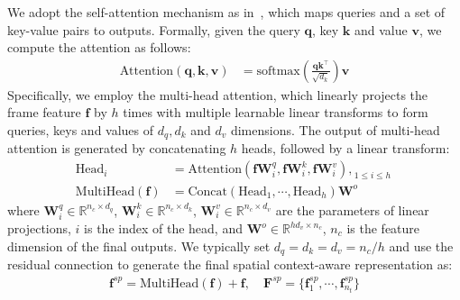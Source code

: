 \documentclass{article}
\begin{document}
We adopt the self-attention mechanism as in~\cite{vaswani2017attention}, which maps queries and a set of key-value pairs to outputs. Formally, given the query $\mathbf{q}$, key $\mathbf{k}$ and value $\mathbf{v}$, we compute the attention as follows:
\begin{align}
	\text{Attention}(\mathbf{q,k,v})&=\text{softmax}(\frac{\mathbf{q}\mathbf{k}^\intercal}{\sqrt{d_k}})\mathbf{v}
\end{align}
Specifically, we employ the multi-head attention, which linearly projects the frame feature $\mathbf{f}$ by $h$ times with multiple learnable linear transforms to form queries, keys and values of $d_q,d_k$ and $d_v$ dimensions. The output of multi-head attention is generated by concatenating $h$ heads, followed by a linear transform:
\begin{align}
	\text{Head}_i& = \text{Attention}(\mathbf{f}\mathbf{W}_i^q,\mathbf{f}\mathbf{W}_i^k,\mathbf{f}\mathbf{W}_i^v),_{\;1\leq i\leq h}\label{eq:head_i}\\	\text{MultiHead}(\mathbf{f})&=\text{Concat}(\text{Head}_1,\cdots,\text{Head}_h)\mathbf{W}^o \label{eq:multihead}
\end{align}
where $\mathbf{W}_i^q\in\mathbb{R}^{n_{c}\times d_q}$, $\mathbf{W}_i^k\in\mathbb{R}^{n_{c}\times d_k}$, $\mathbf{W}_i^v\in\mathbb{R}^{n_{c}\times d_v}$ are the parameters of linear projections, $i$ is the index of the head,
and $\mathbf{W}^o\in\mathbb{R}^{hd_v\times n_{c}}$, $n_{c}$ is the feature dimension of the final outputs. 
We typically set $d_q=d_k=d_v=n_{c}/h$ and use the residual connection to generate the final spatial context-aware representation as:
\begin{align}
	\mathbf{f}^{sp}=\text{MultiHead}(\mathbf{f}) + \mathbf{f},\quad
	\mathbf{F}^{sp}=\{\mathbf{f}^{sp}_{1},\cdots,\mathbf{f}^{sp}_{n_t}\}
\end{align}
\end{document}

